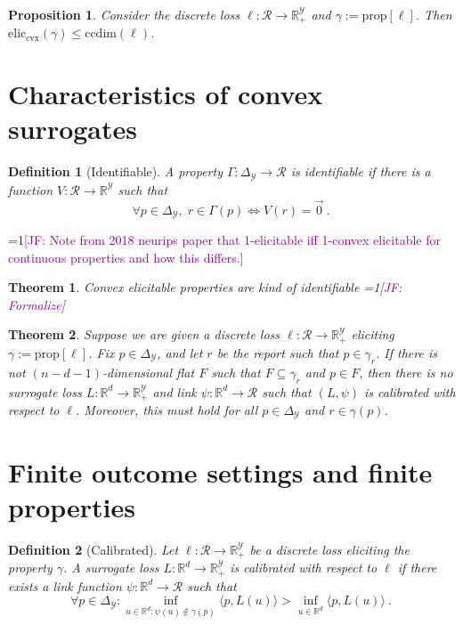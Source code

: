\documentclass{article}
\newcommand{\Comments}{1}
\newcommand{\mynote}[2]{\ifnum\Comments=1\textcolor{#1}{#2}\fi}
\newcommand{\jessie}[1]{\mynote{purple}{[JF: #1]}}
\newcommand{\reals}{\mathbb{R}}
\newcommand{\simplex}{\Delta_\Y}
\newcommand{\prop}[1]{\mathrm{prop}[#1]}
\newcommand{\eliccvx}{\mathrm{elic}_\mathrm{cvx}}
\newcommand{\ccdim}{\mathrm{ccdim}}
\newcommand{\R}{\mathcal{R}}
\newcommand{\Y}{\mathcal{Y}}
\newcommand{\inprod}[2]{\langle #1, #2 \rangle}
\newtheorem{theorem}{Theorem}
\newtheorem{proposition}{Proposition}
\newtheorem{definition}{Definition}
\begin{document}
\begin{proposition}
	Consider the discrete loss $\ell : \R \to \reals^\Y_+$ and $\gamma:= \prop{\ell}$.
	Then $\eliccvx(\gamma) \leq \ccdim(\ell)$.
\end{proposition}


\section{Characteristics of convex surrogates}
\begin{definition}[Identifiable]
	A property $\Gamma: \simplex \to \R$ is \emph{identifiable} if there is a function $V: \R \to \reals^\Y$ such that 
	\begin{equation*}
	\forall p \in \simplex, \; r \in \Gamma(p) \iff V(r) = \vec 0~.~
	\end{equation*}
\end{definition}

\jessie{Note from 2018 neurips paper that 1-elicitable iff 1-convex elicitable for continuous properties and how this differs.}

\begin{theorem}
	Convex elicitable properties are kind of identifiable \jessie{Formalize}
\end{theorem}

\begin{theorem}
	Suppose we are given a discrete loss $\ell:\R \to \reals^\Y_+$ eliciting $\gamma:= \prop{\ell}$.
	Fix $p \in \simplex$, and let $r$ be the report such that $p \in \gamma_r$.  
	If there is not $(n - d - 1)$-dimensional flat $F$ such that $F \subseteq \gamma_r$ and $p \in F$, then there is no surrogate loss $L : \reals^d \to \reals^\Y_+$ and link $\psi:\reals^d \to \R$ such that $(L, \psi)$ is calibrated with respect to $\ell$.
	Moreover, this must hold for all $p \in \simplex$ and $r \in \gamma(p)$.
\end{theorem}

\section{Finite outcome settings and finite properties}
\begin{definition}[Calibrated]
	Let $\ell : \R \to \reals^\Y_+$ be a discrete loss eliciting the property $\gamma$.
	A surrogate loss $L : \reals^d \to \reals^\Y_+$ is \emph{calibrated} with respect to $\ell$ if there exists a link function $\psi: \reals^d \to \R$ such that
	\begin{equation}
	\forall p \in \simplex: \inf_{u \in \reals^d : \psi(u) \not \in \gamma(p)} \inprod{p}{L(u)} > \inf_{u \in \reals^d} \inprod{p}{L(u)}~.~
	\end{equation}
\end{definition}
\end{document}

